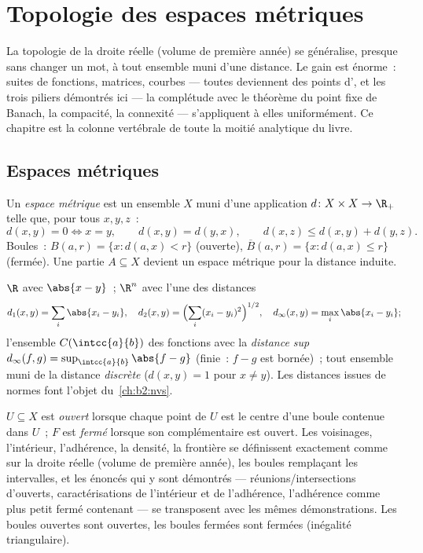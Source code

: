 \chapter{Topologie des espaces métriques}\label{ch:b2:metric}

La topologie de la droite réelle (volume de première année) se
généralise, presque sans changer un mot, à tout ensemble muni d'une
distance. Le gain est énorme~: suites de fonctions, matrices, courbes
--- toutes deviennent des points d', et les trois
piliers démontrés ici --- la complétude avec le théorème du point fixe
de Banach, la compacité, la connexité --- s'appliquent à elles
uniformément. Ce chapitre est la colonne vertébrale de toute la moitié
analytique du livre.

\section{Espaces métriques}

\begin{definition}\label{def:b2:metric:def}
Un \emph{espace métrique} est un ensemble $X$
muni d'une application $d \colon X \times X \to \R_+$ telle que, pour
tous $x, y, z$~:
\[
d(x,y) = 0 \iff x = y,
\qquad
d(x,y) = d(y,x),
\qquad
d(x,z) \leq d(x,y) + d(y,z).
\]
Boules~: $B(a, r) = \{x : d(a,x) < r\}$ (ouverte), $\overline B(a,r) =
\{x : d(a,x) \leq r\}$ (fermée). Une partie $A \subseteq X$ devient un
espace métrique pour la distance induite.
\end{definition}

\begin{example}\label{ex:b2:metric:examples}
$\R$ avec $\abs{x - y}$~; $\R^n$ avec l'une des distances
\[
d_1(x,y) = \sum_i \abs{x_i - y_i},
\quad
d_2(x,y) = \Bigl(\sum_i (x_i - y_i)^2\Bigr)^{1/2},
\quad
d_\infty(x,y) = \max_i \abs{x_i - y_i};
\]
l'ensemble $C(\intcc{a}{b})$ des fonctions  avec la
\emph{distance sup} $d_\infty(f, g) = \sup_{\intcc{a}{b}} \abs{f -
g}$ (finie~: $f - g$ est bornée)~; tout ensemble muni de la distance
\emph{discrète} ($d(x,y) = 1$ pour $x \neq y$). Les distances issues
de normes font l'objet du~\cref{ch:b2:nvs}.
\end{example}

\begin{definition}\label{def:b2:metric:topology}
$U \subseteq X$ est \emph{ouvert}
lorsque chaque point de $U$ est le centre d'une boule contenue dans
$U$~; $F$ est \emph{fermé} lorsque son complémentaire est ouvert. Les
voisinages, l'intérieur, l'adhérence, la densité, la frontière se
définissent exactement comme sur la droite réelle (volume de première
année), les boules remplaçant les intervalles, et les énoncés qui y
sont démontrés --- réunions/intersections d'ouverts, caractérisations
de l'intérieur et de l'adhérence, l'adhérence comme plus petit fermé
contenant --- se transposent avec les mêmes démonstrations. Les boules
ouvertes sont ouvertes, les boules fermées sont fermées (inégalité
triangulaire).
\end{definition}

